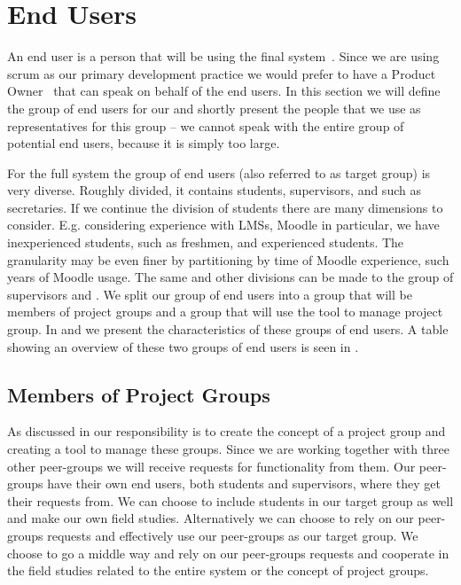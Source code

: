 \section{End Users}
\label{sec:enduser}
An end user is a person that will be using the final system~\cite{Larman04}.
Since we are using scrum as our primary development practice we would prefer to have a Product Owner~\cite{Larman04} that can speak on behalf of the end users.
In this section we will define the group of end users for our \subsystem{} and shortly present the people that we use as representatives for this group -- we cannot speak with the entire group of potential end users, because it is simply too large.

For the full system the group of end users (also referred to as target group) is very diverse.
Roughly divided, it contains students, supervisors, and \admpers{} such as secretaries.
If we continue the division of students there are many dimensions to consider. 
E.g. considering experience with LMSs, Moodle in particular, we have inexperienced students, such as freshmen, and experienced students.
The granularity may be even finer by partitioning by time of Moodle experience, such years of Moodle usage.
The same and other divisions can be made to the group of supervisors and \admpers{}.
We split our group of end users into a group that will be members of project groups and a group that will use the tool to manage project group.
In  and  we present the characteristics of these groups of end users.
A table showing an overview of these two groups of end users is seen in .

\subsection{Members of Project Groups}
\label{sub:endusersmembers}
As discussed in  our responsibility is to create the concept of a project group and creating a tool to manage these groups.
Since we are working together with three other peer-groups we will receive requests for functionality from them.
Our peer-groups have their own end users, both students and supervisors, where they get their requests from.
We can choose to include students in our target group as well and make our own field studies.
Alternatively we can choose to rely on our peer-groups requests and effectively use our peer-groups as our target group.
We choose to go a middle way and rely on our peer-groups requests and cooperate in the field studies related to the entire system or the concept of project groups.

